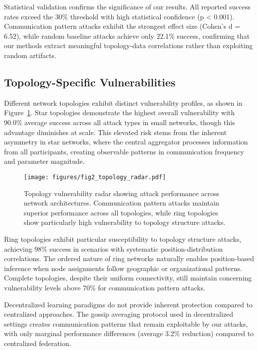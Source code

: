Statistical validation confirms the significance of our results. All reported success rates exceed the 30\% threshold with high statistical confidence (p < 0.001). Communication pattern attacks exhibit the strongest effect size (Cohen's d = 6.52), while random baseline attacks achieve only 22.1\% success, confirming that our methods extract meaningful topology-data correlations rather than exploiting random artifacts.

\subsection{Topology-Specific Vulnerabilities}

Different network topologies exhibit distinct vulnerability profiles, as shown in Figure~\ref{fig:topology_radar}. Star topologies demonstrate the highest overall vulnerability with 90.0\% average success across all attack types in small networks, though this advantage diminishes at scale. This elevated risk stems from the inherent asymmetry in star networks, where the central aggregator processes information from all participants, creating observable patterns in communication frequency and parameter magnitude.

\begin{figure}[!t]
\centering
\texttt{[image: figures/fig2\_topology\_radar.pdf]}
\caption{Topology vulnerability radar showing attack performance across network architectures. Communication pattern attacks maintain superior performance across all topologies, while ring topologies show particularly high vulnerability to topology structure attacks.}
\label{fig:topology_radar}
\end{figure}

Ring topologies exhibit particular susceptibility to topology structure attacks, achieving 98\% success in scenarios with systematic position-distribution correlations. The ordered nature of ring networks naturally enables position-based inference when node assignments follow geographic or organizational patterns. Complete topologies, despite their uniform connectivity, still maintain concerning vulnerability levels above 70\% for communication pattern attacks.

Decentralized learning paradigms do not provide inherent protection compared to centralized approaches. The gossip averaging protocol used in decentralized settings creates communication patterns that remain exploitable by our attacks, with only marginal performance differences (average 3.2\% reduction) compared to centralized federation.

